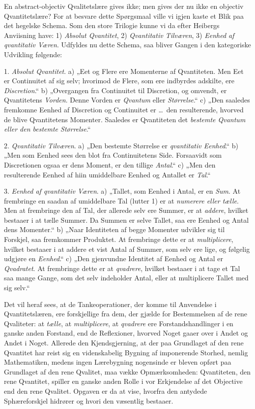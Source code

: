 \documentclass[12pt]{book}
\newcommand{\opage}[1]{\marginnote{\footnotesize\textit{[#1]}}}
\begin{document}
En abstract-objectiv Qvalitetslære gives ikke; men gives der nu ikke en objectiv Qvantitetslære? For
at besvare dette Spørgsmaal ville vi igjen kaste et Blik paa det hegelske Schema. Som den store
Trilogie kunne vi da efter Heibergs Anviisning have: 1) \emph{Absolut Qvantitet}, 2) \emph{Qvantitativ
Tilværen}, 3) \emph{Eenhed af qvantitativ Væren}. Udfyldes nu dette Schema, saa bliver Gangen i den
kategoriske Udvikling følgende:

1. \emph{Absolut Qvantitet}. a) „Eet og Flere ere Momenterne af Qvantiteten. Men Eet er Continuitet af
sig selv; hvorimod de Flere, som ere indbyrdes adskilte, ere \emph{Discretion}.“ b) „Overgangen fra
Continuitet til Discretion, og omvendt, er Qvantitetens \emph{Vorden}. Denne Vorden er \emph{Qvantum}
eller \emph{Størrelse}.“ c) „Den saaledes fremkomne Eenhed af Discretion og Continuitet er \ldots\ den
resulterende, hvorved de blive Qvantitetens Momenter. Saaledes er Qvantiteten det \emph{bestemte
Qvantum eller den bestemte Størrelse}.“

2. \emph{Qvantitativ Tilværen}. a) „Den bestemte Størrelse er \emph{qvantitativ Eenhed}.“ b) „Men som
Eenhed sees den blot fra Continuitetens Side. Forsaavidt som Discretionen ogsaa er dens Moment, er den
tillige \emph{Antal}.“ c) „Men den resulterende Eenhed af hiin umiddelbare Eenhed og Antallet er
\emph{Tal}.“

3. \emph{Eenhed af qvantitativ Væren}. a) „Tallet, som Eenhed i Antal, er en \emph{Sum}.
At frembringe en saadan af umiddelbare Tal (lutter 1) er at \emph{numerere eller tælle}. Men at
frembringe den af Tal, der allerede selv ere Summer, er at \emph{addere}, hvilket bestaaer i at tælle
Summer. Da Summen er selve Tallet, saa ere Eenhed og Antal dens Momenter.“ b) „Naar Identiteten af
begge Momenter udvikler sig til
\opage{294} Forskjel, saa fremkommer Produktet. At frembringe dette er at \emph{multiplicere}, hvilket bestaaer i at
addere et vist Antal af Summer, som selv ere lige, og følgelig udgjøre en \emph{Eenhed}.“ c) „Den
gjenvundne Identitet af Eenhed og Antal er \emph{Qvadratet}. At frembringe dette er at \emph{qvadrere},
hvilket bestaaer i at tage et Tal saa mange Gange, som det selv indeholder Antal, eller at multiplicere
Tallet med sig selv.“

Det vil heraf sees, at de Tankeoperationer, der komme til Anvendelse i Qvantitetslæren, ere
forskjellige fra dem, der gjælde for Bestemmelsen af de rene Qvaliteter: at \emph{tælle}, at
\emph{multiplicere}, at \emph{qvadrere} ere Forstandshandlinger i en ganske anden Forstand, end de
Reflexioner, hvorved Noget gaaer over i Andet og Andet i Noget. Allerede den Kjendsgjerning, at der paa
Grundlaget af den rene Qvantitet har reist sig en videnskabelig Bygning af imponerende Storhed, nemlig
Mathematiken, medens ingen Lærebygning nogensinde er bleven opført paa Grundlaget af den rene Qvalitet,
maa vække Opmærksomheden: Qvantiteten, den rene Qvantitet, spiller en ganske anden Rolle i vor
Erkjendelse af det Objective end den rene Qvalitet. Opgaven er da at vise, hvorfra den antydede
Sphæreforskjel hidrører og hvori den væsentlig bestaaer.
\end{document}
